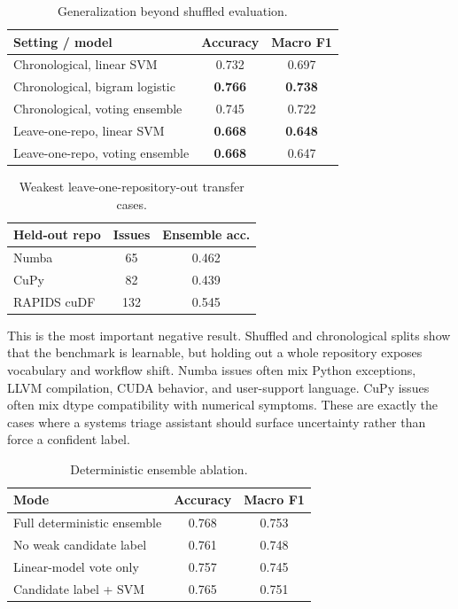 \documentclass[sigplan,10pt]{acmart}
\begin{document}
\begin{table}[t]
\centering
\caption{Generalization beyond shuffled evaluation.}
\label{tab:generalization}
\begin{tabular}{lcc}
\toprule
Setting / model & Accuracy & Macro F1 \\
\midrule
Chronological, linear SVM & 0.732 & 0.697 \\
Chronological, bigram logistic & \textbf{0.766} & \textbf{0.738} \\
Chronological, voting ensemble & 0.745 & 0.722 \\
Leave-one-repo, linear SVM & \textbf{0.668} & \textbf{0.648} \\
Leave-one-repo, voting ensemble & \textbf{0.668} & 0.647 \\
\bottomrule
\end{tabular}
\end{table}

\begin{table}[t]
\centering
\caption{Weakest leave-one-repository-out transfer cases.}
\label{tab:repo_weakness}
\begin{tabular}{lcc}
\toprule
Held-out repo & Issues & Ensemble acc. \\
\midrule
Numba & 65 & 0.462 \\
CuPy & 82 & 0.439 \\
RAPIDS cuDF & 132 & 0.545 \\
\bottomrule
\end{tabular}
\end{table}

This is the most important negative result. Shuffled and chronological splits
show that the benchmark is learnable, but holding out a whole repository
exposes vocabulary and workflow shift. Numba issues often mix Python exceptions,
LLVM compilation, CUDA behavior, and user-support language. CuPy issues often
mix dtype compatibility with numerical symptoms. These are exactly the cases
where a systems triage assistant should surface uncertainty rather than force a
confident label.

\begin{table}[t]
\centering
\caption{Deterministic ensemble ablation.}
\label{tab:ablation}
\begin{tabular}{lcc}
\toprule
Mode & Accuracy & Macro F1 \\
\midrule
Full deterministic ensemble & 0.768 & 0.753 \\
No weak candidate label & 0.761 & 0.748 \\
Linear-model vote only & 0.757 & 0.745 \\
Candidate label + SVM & 0.765 & 0.751 \\
\bottomrule
\end{tabular}
\end{table}
\end{document}
